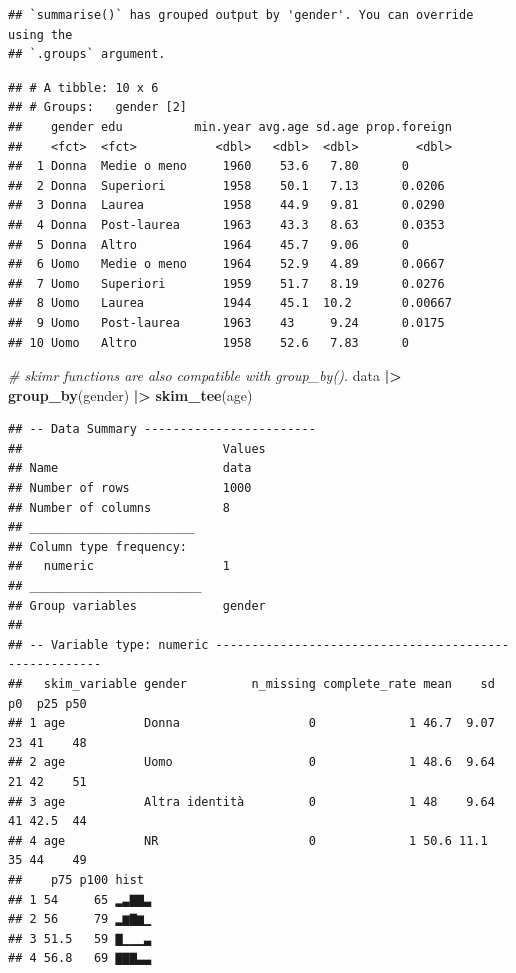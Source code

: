 \documentclass[
]{book}
\newenvironment{Shaded}{\begin{snugshade}}{\end{snugshade}}
\newcommand{\CommentTok}[1]{\textcolor[rgb]{0.56,0.35,0.01}{\textit{#1}}}
\newcommand{\FunctionTok}[1]{\textcolor[rgb]{0.13,0.29,0.53}{\textbf{#1}}}
\newcommand{\NormalTok}[1]{#1}
\newcommand{\SpecialCharTok}[1]{\textcolor[rgb]{0.81,0.36,0.00}{\textbf{#1}}}
\begin{document}
\begin{verbatim}
## `summarise()` has grouped output by 'gender'. You can override using the
## `.groups` argument.
\end{verbatim}

\begin{verbatim}
## # A tibble: 10 x 6
## # Groups:   gender [2]
##    gender edu          min.year avg.age sd.age prop.foreign
##    <fct>  <fct>           <dbl>   <dbl>  <dbl>        <dbl>
##  1 Donna  Medie o meno     1960    53.6   7.80      0      
##  2 Donna  Superiori        1958    50.1   7.13      0.0206 
##  3 Donna  Laurea           1958    44.9   9.81      0.0290 
##  4 Donna  Post-laurea      1963    43.3   8.63      0.0353 
##  5 Donna  Altro            1964    45.7   9.06      0      
##  6 Uomo   Medie o meno     1964    52.9   4.89      0.0667 
##  7 Uomo   Superiori        1959    51.7   8.19      0.0276 
##  8 Uomo   Laurea           1944    45.1  10.2       0.00667
##  9 Uomo   Post-laurea      1963    43     9.24      0.0175 
## 10 Uomo   Altro            1958    52.6   7.83      0
\end{verbatim}

\begin{Shaded}
\begin{Highlighting}[]
\CommentTok{\# skimr functions are also compatible with group\_by().}
\NormalTok{data }\SpecialCharTok{|\textgreater{}} 
  \FunctionTok{group\_by}\NormalTok{(gender) }\SpecialCharTok{|\textgreater{}} 
  \FunctionTok{skim\_tee}\NormalTok{(age)}
\end{Highlighting}
\end{Shaded}

\begin{verbatim}
## -- Data Summary ------------------------
##                            Values
## Name                       data  
## Number of rows             1000  
## Number of columns          8     
## _______________________          
## Column type frequency:           
##   numeric                  1     
## ________________________         
## Group variables            gender
## 
## -- Variable type: numeric ------------------------------------------------------
##   skim_variable gender         n_missing complete_rate mean    sd p0  p25 p50
## 1 age           Donna                  0             1 46.7  9.07 23 41    48
## 2 age           Uomo                   0             1 48.6  9.64 21 42    51
## 3 age           Altra identità         0             1 48    9.64 41 42.5  44
## 4 age           NR                     0             1 50.6 11.1  35 44    49
##    p75 p100 hist 
## 1 54     65 ▂▃▇▇▃
## 2 56     79 ▂▆▇▆▁
## 3 51.5   59 ▇▁▁▁▃
## 4 56.8   69 ▇▇▇▃▃
\end{verbatim}
\end{document}

